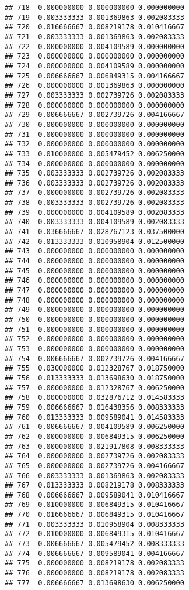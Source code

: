 \documentclass[
]{article}
\begin{document}
\begin{verbatim}
## 718  0.000000000 0.000000000 0.000000000
## 719  0.003333333 0.001369863 0.002083333
## 720  0.016666667 0.008219178 0.010416667
## 721  0.003333333 0.001369863 0.002083333
## 722  0.000000000 0.004109589 0.000000000
## 723  0.000000000 0.000000000 0.000000000
## 724  0.000000000 0.004109589 0.000000000
## 725  0.006666667 0.006849315 0.004166667
## 726  0.000000000 0.001369863 0.000000000
## 727  0.003333333 0.002739726 0.002083333
## 728  0.000000000 0.000000000 0.000000000
## 729  0.006666667 0.002739726 0.004166667
## 730  0.000000000 0.000000000 0.000000000
## 731  0.000000000 0.000000000 0.000000000
## 732  0.000000000 0.000000000 0.000000000
## 733  0.010000000 0.005479452 0.006250000
## 734  0.000000000 0.000000000 0.000000000
## 735  0.003333333 0.002739726 0.002083333
## 736  0.003333333 0.002739726 0.002083333
## 737  0.000000000 0.002739726 0.002083333
## 738  0.003333333 0.002739726 0.002083333
## 739  0.000000000 0.004109589 0.002083333
## 740  0.003333333 0.004109589 0.002083333
## 741  0.036666667 0.028767123 0.037500000
## 742  0.013333333 0.010958904 0.012500000
## 743  0.000000000 0.000000000 0.000000000
## 744  0.000000000 0.000000000 0.000000000
## 745  0.000000000 0.000000000 0.000000000
## 746  0.000000000 0.000000000 0.000000000
## 747  0.000000000 0.000000000 0.000000000
## 748  0.000000000 0.000000000 0.000000000
## 749  0.000000000 0.000000000 0.000000000
## 750  0.000000000 0.000000000 0.000000000
## 751  0.000000000 0.000000000 0.000000000
## 752  0.000000000 0.000000000 0.000000000
## 753  0.000000000 0.000000000 0.000000000
## 754  0.006666667 0.002739726 0.004166667
## 755  0.030000000 0.012328767 0.018750000
## 756  0.013333333 0.013698630 0.018750000
## 757  0.000000000 0.012328767 0.006250000
## 758  0.000000000 0.032876712 0.014583333
## 759  0.006666667 0.016438356 0.008333333
## 760  0.013333333 0.009589041 0.014583333
## 761  0.006666667 0.004109589 0.006250000
## 762  0.000000000 0.006849315 0.006250000
## 763  0.000000000 0.021917808 0.008333333
## 764  0.000000000 0.002739726 0.002083333
## 765  0.000000000 0.002739726 0.004166667
## 766  0.003333333 0.001369863 0.002083333
## 767  0.013333333 0.008219178 0.008333333
## 768  0.006666667 0.009589041 0.010416667
## 769  0.010000000 0.006849315 0.010416667
## 770  0.016666667 0.006849315 0.010416667
## 771  0.003333333 0.010958904 0.008333333
## 772  0.010000000 0.006849315 0.010416667
## 773  0.006666667 0.005479452 0.008333333
## 774  0.006666667 0.009589041 0.004166667
## 775  0.000000000 0.008219178 0.002083333
## 776  0.000000000 0.008219178 0.002083333
## 777  0.006666667 0.013698630 0.006250000

\end{verbatim}
\end{document}
